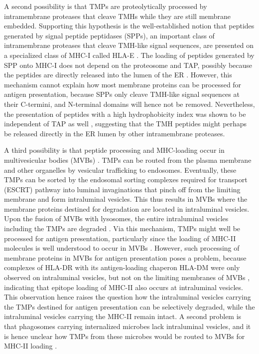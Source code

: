 A second possibility is that TMPs are proteolytically processed 
by intramembrane proteases that cleave TMHs while they are still membrane embedded. Supporting this hypothesis is the well-established notion that peptides generated by signal peptide peptidases (SPPs), an important class of intramembrane proteases that cleave TMH-like signal sequences, 
are presented on a specialized class of MHC-I called HLA-E \cite{oliveira2015alternative}. 
The loading of peptides generated by SPP onto MHC-I does not depend on the proteosome and TAP, 
possibly because the peptides are directly released into the lumen of the ER \cite{oliveira2015alternative}. 
However, this mechanism cannot explain how most membrane proteins can be processed for antigen presentation, because SPPs only cleave TMH-like signal sequences at their C-termini, and N-terminal domains will hence not be removed. 
Nevertheless, the presentation of peptides with a high hydrophobicity index 
was shown to be independent of TAP as well \cite{lautscham2001processing}, 
suggesting that the TMH peptides might perhaps be released directly in the ER lumen by other intramembrane proteases. 

A third possibility is that peptide processing and MHC-loading occur in multivesicular bodies (MVBs) \cite{oliveira2015alternative}. 
TMPs can be routed from the plasma membrane and other organelles by vesicular trafficking to endosomes. Eventually, these TMPs can be sorted by the endosomal sorting complexes required for transport (ESCRT) pathway into luminal invaginations that pinch off from the limiting membrane and form intraluminal vesicles. This thus results in MVBs where the membrane proteins destined for degradation are located in intraluminal vesicles. Upon the fusion of MVBs with lysosomes, 
the entire intraluminal vesicles including the TMPs are degraded \cite{gruenberg2020life}. 
Via this mechanism, TMPs might well be processed for antigen presentation, 
particularly since the loading of MHC-II molecules is well understood 
to occur in MVBs \cite{kleijmeer2001reorganization,peters1991segregation,zwart2005spatial}. 
However, such processing of membrane proteins in MVBs for antigen presentation poses a problem, because complexes of HLA-DR with its antigen-loading chaperon HLA-DM were only observed on intraluminal vesicles, 
but not on the limiting membranes of MVBs \cite{zwart2005spatial}, 
indicating that epitope loading of MHC-II also occurs at intraluminal vesicles. This observation hence raises the question how the intraluminal vesicles carrying the TMPs destined for antigen presentation can be selectively degraded, while the intraluminal vesicles carrying the MHC-II remain intact. A second problem is that phagosomes carrying internalized microbes lack intraluminal vesicles, 
and it is hence unclear how TMPs from these microbes 
would be routed to MVBs for MHC-II loading \cite{zwart2005spatial}.

